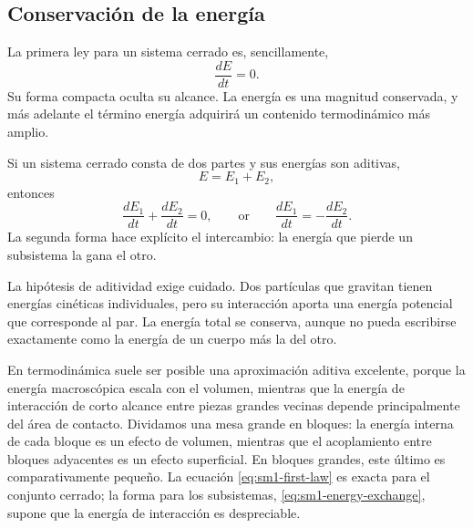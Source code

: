 \subsection{Conservación de la energía}

La primera ley para un sistema cerrado es, sencillamente,
\begin{equation}
 \frac{dE}{dt}=0.
 \label{eq:sm1-first-law}
\end{equation}
Su forma compacta oculta su alcance. La energía es una magnitud conservada, y más adelante el término energía adquirirá un contenido termodinámico más amplio.

Si un sistema cerrado consta de dos partes y sus energías son aditivas,
\begin{equation}
 E=E_1+E_2,
\end{equation}
entonces
\begin{equation}
 \frac{dE_1}{dt}+\frac{dE_2}{dt}=0,
 \qquad\text{or}\qquad
 \frac{dE_1}{dt}=-\frac{dE_2}{dt}.
 \label{eq:sm1-energy-exchange}
\end{equation}
La segunda forma hace explícito el intercambio: la energía que pierde un subsistema la gana el otro.

La hipótesis de aditividad exige cuidado. Dos partículas que gravitan tienen energías cinéticas individuales, pero su interacción aporta una energía potencial que corresponde al par. La energía total se conserva, aunque no pueda escribirse exactamente como la energía de un cuerpo más la del otro.

En termodinámica suele ser posible una aproximación aditiva excelente, porque la energía macroscópica escala con el volumen, mientras que la energía de interacción de corto alcance entre piezas grandes vecinas depende principalmente del área de contacto. Dividamos una mesa grande en bloques: la energía interna de cada bloque es un efecto de volumen, mientras que el acoplamiento entre bloques adyacentes es un efecto superficial. En bloques grandes, este último es comparativamente pequeño. La ecuación \eqref{eq:sm1-first-law} es exacta para el conjunto cerrado; la forma para los subsistemas, \eqref{eq:sm1-energy-exchange}, supone que la energía de interacción es despreciable.

\begin{classroomqa}
\end{classroomqa}


